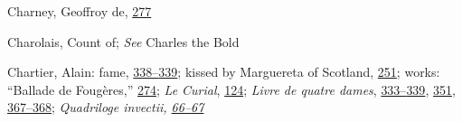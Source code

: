 Charney, Geoffroy de,
\protect\hyperlink{18_Chapter_Eleven__THE_FORMS_OF_THO.xhtmlux5cux23page_277}{277}

Charolais, Count of; \emph{See} Charles the Bold

Chartier, Alain: fame,
\protect\hyperlink{21_Chapter_Thirteen__IMAGE_AND_WORD.xhtmlux5cux23page_338}{338--}\protect\hyperlink{21_Chapter_Thirteen__IMAGE_AND_WORD.xhtmlux5cux23page_339}{339};
kissed by Marguereta of Scotland,
\protect\hyperlink{17_Chapter_Ten__THE_FAILURE_OF_IMAG.xhtmlux5cux23page_251}{251};
works: ``Ballade de Fougères,''
\protect\hyperlink{18_Chapter_Eleven__THE_FORMS_OF_THO.xhtmlux5cux23page_274}{274};
\emph{Le Curial},
\protect\hyperlink{10_Chapter_Three__THE_HEROIC_DREAM.xhtmlux5cux23page_124}{124};
\emph{Livre de quatre dames},
\protect\hyperlink{21_Chapter_Thirteen__IMAGE_AND_WORD.xhtmlux5cux23page_333}{333--}\protect\hyperlink{21_Chapter_Thirteen__IMAGE_AND_WORD.xhtmlux5cux23page_339}{339},
\protect\hyperlink{21_Chapter_Thirteen__IMAGE_AND_WORD.xhtmlux5cux23page_351}{351},
\protect\hyperlink{21_Chapter_Thirteen__IMAGE_AND_WORD.xhtmlux5cux23page_367}{367--}\protect\hyperlink{21_Chapter_Thirteen__IMAGE_AND_WORD.xhtmlux5cux23page_368}{368};
\emph{Quadriloge invectii,
\protect\hyperlink{10_Chapter_Three__THE_HEROIC_DREAM.xhtmlux5cux23page_66}{66--}\protect\hyperlink{10_Chapter_Three__THE_HEROIC_DREAM.xhtmlux5cux23page_67}{67}}

